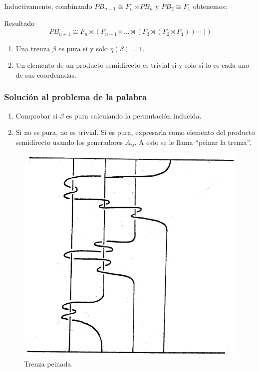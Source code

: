 \documentclass{beamer}
\theoremstyle{definition}
\begin{document}
\begin{frame}
Inductivamente, combinando $PB_{n+1}\cong F_n\rtimes PB_n$ y $PB_2\cong F_1$ obtenemos:

\begin{block}{Resultado}
$$PB_{n+1}\cong F_n\rtimes (F_{n-1} \rtimes\dots\rtimes (F_3\rtimes (F_2\rtimes F_1))\cdots))$$
\end{block}

\begin{enumerate}
\item<1-> Una trenza $\beta$ es pura si y solo $\eta(\beta)=1$.
\item<2-> Un elemento de un producto semidirecto es trivial si y solo si lo es cada uno de sus coordenadas.
\end{enumerate}
\end{frame}

\begin{frame}
\frametitle{Solución al problema de la palabra}
\begin{enumerate}
\item<1-> Comprobar si $\beta$ es pura calculando la permutación inducida.
\item<2-> Si no es pura, no es trivial. Si es pura, expresarla como elemento del producto semidirecto usando los generadores $A_{ij}$. A esto se le llama ``peinar la trenza''.
\end{enumerate}

\end{frame}

\begin{frame}


\begin{figure}
\begin{turn}{1.5}
\includegraphics[scale=0.4]{Imagenes/peinado}
\end{turn}
\caption{Trenza peinada.}
\end{figure}

\end{frame}
\end{document}
